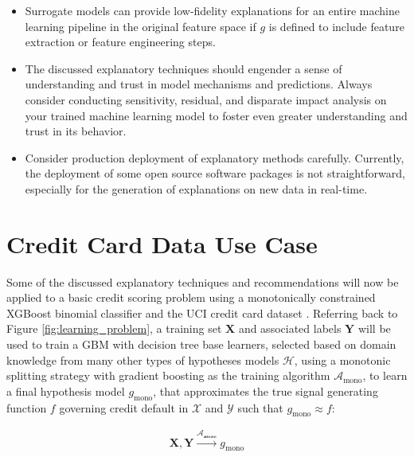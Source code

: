 \documentclass[sigconf, review]{acmart}
\begin{document}
\begin{itemize}
	\item Surrogate models can provide low-fidelity explanations for an entire machine learning pipeline in the original feature space if $g$ is defined to include feature extraction or feature engineering steps.\\
	
	\item The discussed explanatory techniques should engender a sense of understanding and trust in model mechanisms and predictions. Always consider conducting sensitivity, residual, and disparate impact analysis on your trained machine learning model to foster even greater understanding and trust in its behavior.\\
	
	\item Consider production deployment of explanatory methods carefully. Currently, the deployment of some open source software packages is not straightforward, especially for the generation of explanations on new data in real-time.\\
	
\end{itemize}

\section{Credit Card Data Use Case} \label{sec:use_case}

Some of the discussed explanatory techniques and recommendations will now be applied to a basic credit scoring problem using a monotonically constrained XGBoost binomial classifier and the UCI credit card dataset \cite{uci}. Referring back to Figure \ref{fig:learning_problem}, a training set $\mathbf{X}$ and associated labels $\mathbf{Y}$ will be used to train a GBM with decision tree base learners, selected based on domain knowledge from many other types of hypotheses models $\mathcal{H}$, using a monotonic splitting strategy with gradient boosting as the training algorithm $\mathcal{A}_{\text{mono}}$, to learn a final hypothesis model $g_{\text{mono}}$, that approximates the true signal generating function $f$ governing credit default in $\mathcal{X}$ and $\mathcal{Y}$ such that $g_{\text{mono}} \approx f$:

\begin{equation}
\label{eq:cc_training}
\begin{aligned}
\mathbf{X}, \mathbf{Y} \xrightarrow{\mathcal{A_{\text{mono}}}} g_{\text{mono}}
\end{aligned}
\end{equation}
\end{document}
